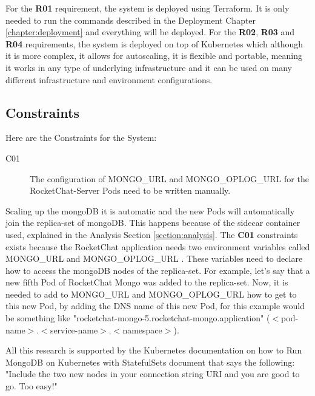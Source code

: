 \documentclass[12pt,a4paper,oneside]{report}
\begin{document}
For the \textbf{R01} requirement, the system is deployed using Terraform. It is only needed to run the commands described in the Deployment Chapter \ref{chapter:deployment} and everything will be deployed. For the \textbf{R02}, \textbf{R03} and \textbf{R04} requirements, the system is deployed on top of Kubernetes which although it is more complex, it allows for autoscaling, it is flexible and portable, meaning it works in any type of underlying infrastructure and it can be used on many different infrastructure and environment configurations.

\subsection{Constraints}
\label{section:constraints}
Here are the Constraints for the System:
\begin{description}
\item[C01] The configuration of MONGO\_URL and MONGO\_OPLOG\_URL for the RocketChat-Server Pods need to be written manually.
\end{description}

Scaling up the \ac{mongoDB} it is automatic and the new Pods will automatically join the replica-set of \ac{mongoDB}. This happens because of the sidecar container used, explained in the Analysis Section \ref{section:analysis}. The \textbf{C01} constraints exists because the RocketChat application needs two environment variables called MONGO\_URL and \newline MONGO\_OPLOG\_URL \cite{rocketchat-create-docker-container}. These variables need to declare how to access the \ac{mongoDB} nodes of the replica-set. For example, let's say that a new fifth Pod of RocketChat Mongo was added to the replica-set. Now, it is needed to add to MONGO\_URL and MONGO\_OPLOG\_URL how to get to this new Pod, by adding the DNS name of this new Pod, for this example would be something like "rocketchat-mongo-5.rocketchat-mongo.application" ($<$pod-name$>$.$<$service-name$>$.$<$namespace$>$).

All this research is supported by the Kubernetes documentation on how to Run MongoDB on Kubernetes with StatefulSets document \cite{running-mongodb-on-kubernetes} that says the following: "Include the two new nodes in your connection string URI and you are good to go. Too easy!"

\end{document}
